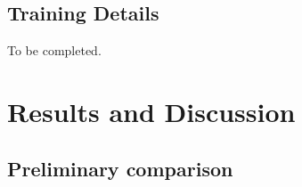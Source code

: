 \documentclass[journal,twoside,web]{ieeecolor}
\begin{document}
\subsection*{Training Details}
To be completed.


\section{Results and Discussion}
\label{sec:Results and Discussion}



\subsection{Preliminary comparison}
\end{document}

